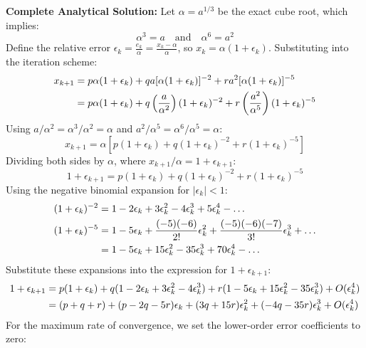 \documentclass[11pt,a4paper]{article}
\numberwithin{equation}{section}
\begin{document}
\begin{solbox}
\textbf{Complete Analytical Solution:}
Let $\alpha = a^{1/3}$ be the exact cube root, which implies:
\begin{equation}
    \alpha^3 = a \quad \text{and} \quad \alpha^6 = a^2
\end{equation}
Define the relative error $\epsilon_k = \frac{e_k}{\alpha} = \frac{x_k - \alpha}{\alpha}$, so $x_k = \alpha(1 + \epsilon_k)$. Substituting into the iteration scheme:
\begin{align}
    x_{k+1} &= p \alpha(1 + \epsilon_k) + q a [\alpha(1+\epsilon_k)]^{-2} + r a^2 [\alpha(1+\epsilon_k)]^{-5} \notag \\
    &= p \alpha(1 + \epsilon_k) + q \left(\frac{a}{\alpha^2}\right) (1+\epsilon_k)^{-2} + r \left(\frac{a^2}{\alpha^5}\right) (1+\epsilon_k)^{-5}
\end{align}
Using $a/\alpha^2 = \alpha^3/\alpha^2 = \alpha$ and $a^2/\alpha^5 = \alpha^6/\alpha^5 = \alpha$:
\begin{equation}
    x_{k+1} = \alpha \left[ p(1+\epsilon_k) + q(1+\epsilon_k)^{-2} + r(1+\epsilon_k)^{-5} \right]
\end{equation}
Dividing both sides by $\alpha$, where $x_{k+1}/\alpha = 1 + \epsilon_{k+1}$:
\begin{equation}
    1 + \epsilon_{k+1} = p(1+\epsilon_k) + q(1+\epsilon_k)^{-2} + r(1+\epsilon_k)^{-5}
\end{equation}
Using the negative binomial expansion for $| \epsilon_k | < 1$:
\begin{align}
    (1+\epsilon_k)^{-2} &= 1 - 2\epsilon_k + 3\epsilon_k^2 - 4\epsilon_k^3 + 5\epsilon_k^4 - \dots \\
    (1+\epsilon_k)^{-5} &= 1 - 5\epsilon_k + \frac{(-5)(-6)}{2!}\epsilon_k^2 + \frac{(-5)(-6)(-7)}{3!}\epsilon_k^3 + \dots \notag \\
    &= 1 - 5\epsilon_k + 15\epsilon_k^2 - 35\epsilon_k^3 + 70\epsilon_k^4 - \dots
\end{align}
Substitute these expansions into the expression for $1 + \epsilon_{k+1}$:
\begin{align}
    1 + \epsilon_{k+1} &= p(1 + \epsilon_k) + q(1 - 2\epsilon_k + 3\epsilon_k^2 - 4\epsilon_k^3) + r(1 - 5\epsilon_k + 15\epsilon_k^2 - 35\epsilon_k^3) + O(\epsilon_k^4) \notag \\
    &= (p + q + r) + (p - 2q - 5r)\epsilon_k + (3q + 15r)\epsilon_k^2 + (-4q - 35r)\epsilon_k^3 + O(\epsilon_k^4)
\end{align}
For the maximum rate of convergence, we set the lower-order error coefficients to zero:

\end{solbox}
\end{document}
